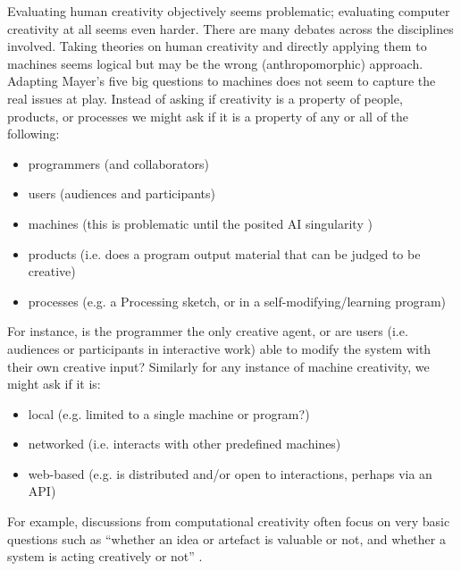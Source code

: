 \begin{leftbar}
  Evaluating human creativity objectively seems problematic; evaluating computer creativity at all seems even harder. There are many debates across the disciplines involved. Taking theories on human creativity and directly applying them to machines seems logical but may be the wrong (anthropomorphic) approach. Adapting Mayer's five big questions \cite{Mayer1999} to machines does not seem to capture the real issues at play. Instead of asking if creativity is a property of people, products, or processes we might ask if it is a property of any or all of the following:

  \begin{itemize}
    \item programmers (and collaborators)
    \item users (audiences and participants)
    \item machines (this is problematic until the posited AI singularity \cite{Schmidhuber2006a})
    \item products (i.e. does a program output material that can be judged to be creative)
    \item processes (e.g. a Processing sketch, or in a self-modifying/learning program)
  \end{itemize}

  For instance, is the programmer the only creative agent, or are users (i.e. audiences or participants in interactive work) able to modify the system with their own creative input? Similarly for any instance of machine creativity, we might ask if it is:

  \begin{itemize}
    \item local (e.g. limited to a single machine or program?)
    \item networked (i.e. interacts with other predefined machines)
    \item web-based (e.g. is distributed and/or open to interactions, perhaps via an API)
  \end{itemize}

  For example, discussions from computational creativity often focus on very basic questions such as ``whether an idea or artefact is valuable or not, and whether a system is acting creatively or not'' \cite{Pease2011}.
\end{leftbar}


